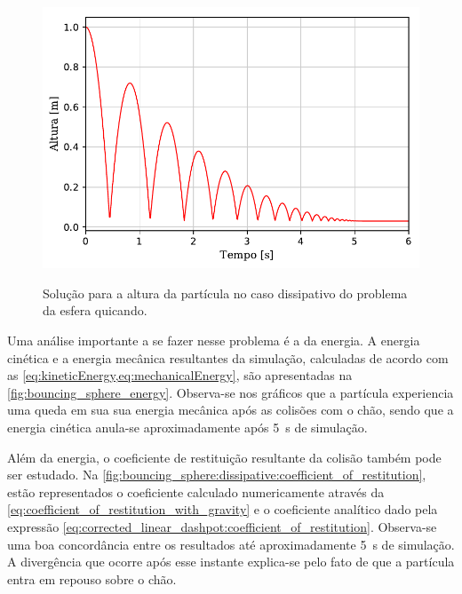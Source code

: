 \begin{figure}[htb!]
	\caption{Solução para a altura da partícula no caso dissipativo do problema da esfera quicando.}
	\centering
		\includegraphics[scale=1]{images/bouncing_sphere/dissipative/y_position.pdf}
	\label{fig:bouncing_sphere_y_position}
	\sourceMe
\end{figure}

Uma análise importante a se fazer nesse problema é a da energia. A energia cinética e a energia mecânica resultantes da simulação, calculadas de acordo com as \cref{eq:kineticEnergy,eq:mechanicalEnergy}, são apresentadas na \cref{fig:bouncing_sphere_energy}. Observa-se nos gráficos que a partícula experiencia uma queda em sua sua energia mecânica após as colisões com o chão, sendo que a energia cinética anula-se aproximadamente após \SI{5}{\second} de simulação.

Além da energia, o coeficiente de restituição resultante da colisão também pode ser estudado. Na \cref{fig:bouncing_sphere:dissipative:coefficient_of_restitution}, estão representados o coeficiente calculado numericamente através da \cref{eq:coefficient_of_restitution_with_gravity} e o coeficiente analítico dado pela expressão \eqref{eq:corrected_linear_dashpot:coefficient_of_restitution}. Observa-se uma boa concordância entre os resultados até aproximadamente \SI{5}{\second} de simulação. A divergência que ocorre após esse instante explica-se pelo fato de que a partícula entra em repouso sobre o chão.

